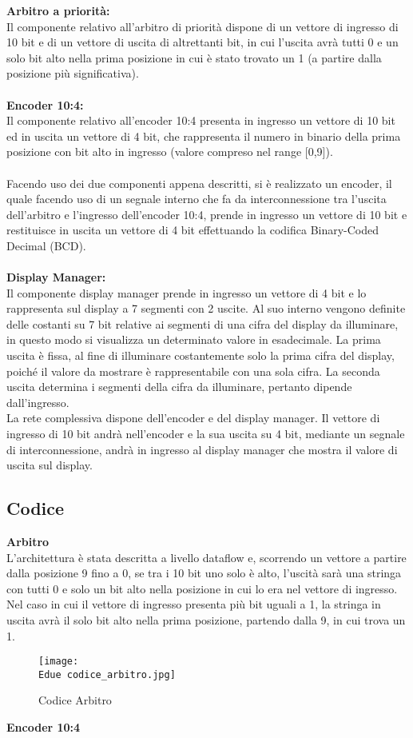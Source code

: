 \documentclass[12pt]{article}
\def \Edue {Allegati/Esercizio2/}
\begin{document}
    {\large  \textbf{Arbitro a priorità:}}
\\Il componente relativo all’arbitro di priorità dispone di un vettore di ingresso di 10 bit e di un vettore di uscita di altrettanti bit, in cui l’uscita avrà tutti 0 e un solo bit alto nella prima posizione in cui è stato trovato un 1 (a partire dalla posizione più significativa).
\\\\{\large \textbf{Encoder 10:4:}}
\\Il componente relativo all’encoder 10:4 presenta in ingresso un vettore di 10 bit ed in uscita un vettore di 4 bit, che rappresenta il numero in binario della prima posizione con bit alto in ingresso (valore compreso nel range [0,9]).
\\\\Facendo uso dei due componenti appena descritti, si è realizzato un encoder, il quale facendo uso di un segnale interno che fa da interconnessione tra l’uscita dell’arbitro e l’ingresso dell’encoder 10:4, prende in ingresso un vettore di 10 bit e restituisce in uscita un vettore di 4 bit effettuando la codifica Binary-Coded Decimal (BCD).
\\\\{\large \textbf{Display Manager:}}
\\Il componente display manager prende in ingresso un vettore di 4 bit e lo rappresenta sul display a 7 segmenti con 2 uscite. Al suo interno vengono definite delle costanti su 7 bit relative ai segmenti di una cifra del display da illuminare, in questo modo si visualizza un determinato valore in esadecimale. La prima uscita è fissa, al fine di illuminare costantemente solo la prima cifra del display, poiché il valore da mostrare è rappresentabile con una sola cifra. La seconda uscita determina i segmenti della cifra da illuminare, pertanto dipende dall’ingresso.
\\La rete complessiva dispone dell’encoder e del display manager. Il vettore di ingresso di 10 bit andrà nell’encoder e la sua uscita su 4 bit, mediante un segnale di interconnessione, andrà in ingresso al display manager che mostra il valore di uscita sul display.
\newpage
\subsection{Codice}
{\large \textbf{Arbitro}}
\\L’architettura è stata descritta a livello dataflow e, scorrendo un vettore a partire dalla posizione 9 fino a 0, se tra i 10 bit uno solo è alto, l’uscità sarà una stringa con tutti 0 e solo un bit alto nella posizione in cui lo era nel vettore di ingresso. Nel caso in cui il vettore di ingresso presenta più bit uguali a 1, la stringa in uscita avrà il solo bit alto nella prima posizione, partendo dalla 9, in cui trova un 1.
\begin{figure}[ht!]
    \centering
    \texttt{[image: \\Edue codice\_arbitro.jpg]}
    \caption{Codice Arbitro}
\end{figure}
\newpage
{\large \textbf{Encoder 10:4}}
\end{document}
